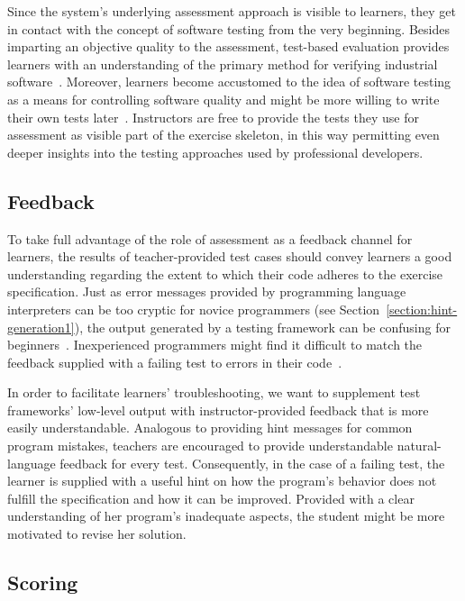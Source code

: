 Since the system's underlying assessment approach is visible to learners, they get in contact with the concept of software testing from the very beginning. Besides imparting an objective quality to the assessment, test-based evaluation provides learners with an understanding of the primary method for verifying industrial software~\cite{douce2005automatic}. Moreover, learners become accustomed to the idea of software testing as a means for controlling software quality and might be more willing to write their own tests later~\cite{vihavainen2013scaffolding}. Instructors are free to provide the tests they use for assessment as visible part of the exercise skeleton, in this way permitting even deeper insights into the testing approaches used by professional developers.

\subsection{Feedback}

To take full advantage of the role of assessment as a feedback channel for learners, the results of teacher-provided test cases should convey learners a good understanding regarding the extent to which their code adheres to the exercise specification. Just as error messages provided by programming language interpreters can be too cryptic for novice programmers (see Section~\ref{section:hint-generation1}), the output generated by a testing framework can be confusing for beginners~\cite{lahtinen2005study}. Inexperienced programmers might find it difficult to match the feedback supplied with a failing test to errors in their code~\cite{singh2013automated}.

In order to facilitate learners' troubleshooting, we want to supplement test frameworks' low-level output with instructor-provided feedback that is more easily understandable. Analogous to providing hint messages for common program mistakes, teachers are encouraged to provide understandable natural-language feedback for every test. Consequently, in the case of a failing test, the learner is supplied with a useful hint on how the program's behavior does not fulfill the specification and how it can be improved. Provided with a clear understanding of her program's inadequate aspects, the student might be more motivated to revise her solution.

\subsection{Scoring}

